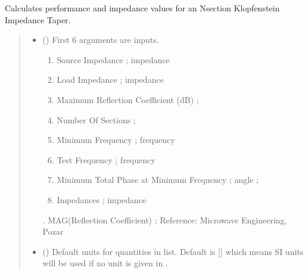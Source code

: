 \documentclass[letterpaper,10pt,english]{sphinxmanual}
\begin{document}
\begin{fulllineitems}
\label{\detokenize{components:components.Klopfenstein_Taper_Impedance_Transformer}}
\pysigstartsignatures
{}
\pysigstopsignatures
\sphinxAtStartPar
Calculates performance and impedance values for an N\sphinxhyphen{}section Klopfenstein Impedance Taper.
\begin{quote}\begin{description}
\begin{itemize}
\item {}
\sphinxAtStartPar
{} () \textendash{}
\sphinxAtStartPar
First 6 arguments are inputs.
\begin{enumerate}
%
\item {}
\sphinxAtStartPar
Source Impedance ; impedance

\item {}
\sphinxAtStartPar
Load Impedance ; impedance

\item {}
\sphinxAtStartPar
Maximum Reflection Coefficient (dB) ;

\item {}
\sphinxAtStartPar
Number Of Sections ;

\item {}
\sphinxAtStartPar
Minimum Frequency ; frequency

\item {}
\sphinxAtStartPar
Test Frequency ; frequency

\item {}
\sphinxAtStartPar
Minimum Total Phase at Minimum Frequency ; angle ;

\item {}
\sphinxAtStartPar
Impedances ; impedance

\end{enumerate}

.  MAG(Reflection Coefficient) ;
Reference:  Microwave Engineering, Pozar


\item {}
\sphinxAtStartPar
{} (\sphinxstyleliteralemphasis{\sphinxupquote{, }}) \textendash{} Default units for quantities in  list. Default is {[}{]} which means SI units will be used if no unit is given in .


\end{itemize}
\end{description}
\end{quote}
\end{fulllineitems}
\end{document}
